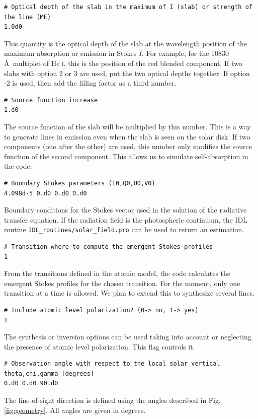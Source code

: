 \documentclass[12pt]{article}
\begin{document}
\begin{small}
\begin{verbatim}
# Optical depth of the slab in the maximum of I (slab) or strength of the line (ME)
1.0d0
\end{verbatim}
\end{small}
This quantity is the optical depth of the slab at the wavelength position of the maximum absorption
or emission in Stokes $I$. For example, for the 10830 \AA\ multiplet of He \textsc{i}, this is the 
position of the red blended component. If two slabs with option 2 or 3 are used, put the two optical depths together. If option -2 is
used, then add the filling factor as a third number.

\begin{verbatim}
# Source function increase
1.d0
\end{verbatim}
The source function of the slab will be multiplied by this number. This is a way to generate
lines in emission even when the slab is seen on the solar disk.
If two components (one after the other) are used, this number only modifies the source 
function of the second component. This allows us to simulate self-absorption in the code.

\begin{verbatim}
# Boundary Stokes parameters (I0,Q0,U0,V0)
4.098d-5 0.d0 0.d0 0.d0
\end{verbatim}
Boundary conditions for the Stokes vector used in the solution of the radiative transfer equation.
If the radiation field is the photospheric continuum, the IDL routine \texttt{IDL\_routines/solar\_field.pro}
can be used to return an estimation.

\begin{verbatim}
# Transition where to compute the emergent Stokes profiles
1
\end{verbatim}
From the transitions defined in the atomic model, the code calculates the emergent Stokes profiles
for the chosen transition. For the moment, only one transition at a time is allowed. We plan to
extend this to synthesize several lines.

\begin{verbatim}
# Include atomic level polarization? (0-> no, 1-> yes)
1
\end{verbatim}
The synthesis or inversion options can be used taking into account or neglecting the presence of 
atomic level polarization. This flag controls it.

\begin{verbatim} 
# Observation angle with respect to the local solar vertical theta,chi,gamma [degrees]
0.d0 0.d0 90.d0
\end{verbatim}
The line-of-sight direction is defined using the angles described
in Fig. \ref{fig:geometry}. All angles are given in degrees.
\end{document}
